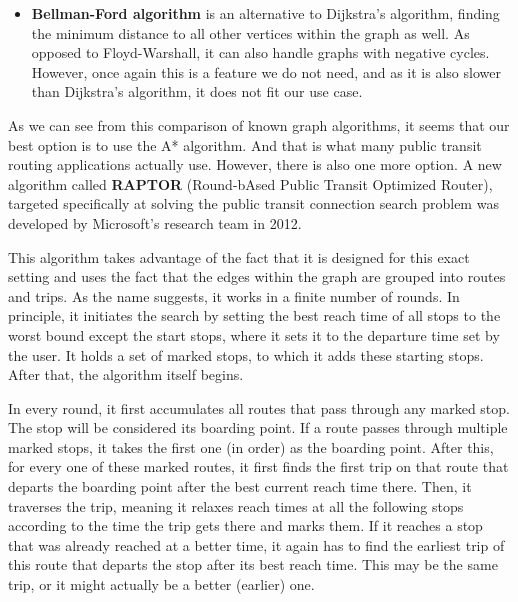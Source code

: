 \begin{itemize}
    \item \textbf{Bellman-Ford algorithm} is an alternative to Dijkstra's algorithm, finding the minimum distance to all other vertices within the graph as well. As opposed to Floyd-Warshall, it can also handle graphs with negative cycles. However, once again this is a feature we do not need, and as it is also slower than Dijkstra's algorithm\cite[pp. 152--153]{mares2017pruvodce}, it does not fit our use case.
\end{itemize}

As we can see from this comparison of known graph algorithms, it seems that our best option is to use the A* algorithm. And that is what many public transit routing applications actually use. However, there is also one more option. A new algorithm called \textbf{RAPTOR} (Round-bAsed Public Transit Optimized Router), targeted specifically at solving the public transit connection search problem was developed by Microsoft's research team in 2012\cite{delling2015raptor}.

This algorithm takes advantage of the fact that it is designed for this exact setting and uses the fact that the edges within the graph are grouped into routes and trips. As the name suggests, it works in a finite number of rounds. In principle, it initiates the search by setting the best reach time of all stops to the worst bound except the start stops, where it sets it to the departure time set by the user. It holds a set of marked stops, to which it adds these starting stops. After that, the algorithm itself begins. 

In every round, it first accumulates all routes that pass through any marked stop. The stop will be considered its boarding point. If a route passes through multiple marked stops, it takes the first one (in order) as the boarding point. After this, for every one of these marked routes, it first finds the first trip on that route that departs the boarding point after the best current reach time there. Then, it traverses the trip, meaning it relaxes reach times at all the following stops according to the time the trip gets there and marks them. If it reaches a stop that was already reached at a better time, it again has to find the earliest trip of this route that departs the stop after its best reach time. This may be the same trip, or it might actually be a better (earlier) one.

